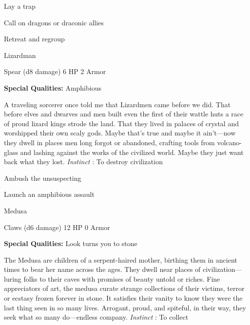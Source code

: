 \startitemize[1,packed]
         
\item Lay a trap

         
\item Call on dragons or draconic allies

         
\item Retreat and regroup

       
\stopitemize
       
\startMonsterName
Lizardman	 
\stopMonsterName
       

Spear (d8 damage)	6 HP	2 Armor

       


       
\startMonsterQualities
         {\bf Special Qualities:}  Amphibious
\stopMonsterQualities
       
\startMonsterDescription
A traveling sorcerer once told me that Lizardmen came before we did. That before elves and dwarves and men built even the first of their wattle huts a race of proud lizard kings strode the land. That they lived in palaces of crystal and worshipped their own scaly gods. Maybe that’s true and maybe it ain’t—now they dwell in places men long forgot or abandoned, crafting tools from volcano-glass and lashing against the works of the civilized world. Maybe they just want back what they lost. {\em Instinct} : To destroy civilization
\stopMonsterDescription
       
\startitemize[1,packed]
         
\item Ambush the unsuspecting

         
\item Launch an amphibious assault

       
\stopitemize
       
\startMonsterName
Medusa	 
\stopMonsterName
       

Claws (d6 damage)	12 HP	0 Armor

       


       
\startMonsterQualities
         {\bf Special Qualities:}  Look turns you to stone
\stopMonsterQualities
       
\startMonsterDescription
The Medusa are children of a serpent-haired mother, birthing them in ancient times to bear her name across the ages. They dwell near places of civilization—luring folks to their caves with promises of beauty untold or riches. Fine appreciators of art, the medusa curate strange collections of their victims, terror or ecstasy frozen forever in stone. It satisfies their vanity to know they were the last thing seen in so many lives. Arrogant, proud, and spiteful, in their way, they seek what so many do—endless company. {\em Instinct} : To collect
\stopMonsterDescription
       
